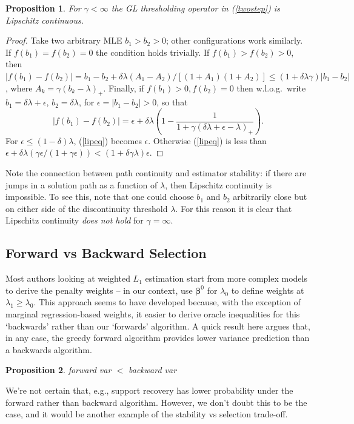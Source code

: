 \documentclass[12pt]{article}
\newtheorem{prop}{\sc Proposition}[section]
\newcommand{\bs}[1]{\boldsymbol{#1}}
\begin{document}
\begin{prop} For $\gamma<\infty$ the GL thresholding  operator in
(\ref{twostep}) is Lipschitz continuous. \end{prop} \begin{proof} Take two
arbitrary MLE $b_1 > b_2 >0$;  other configurations work similarly.   If
$f(b_1) = f(b_2) =0$ the condition holds trivially.   If $f(b_1) > f(b_2) >
0$, then  $|f(b_1) - f(b_2)| = b_1 - b_2 + \delta\lambda (A_1 -
A_2)/[(1+A_1)(1+A_2)] \leq (1+\delta\lambda \gamma)|b_1-b_2|$, where $A_k =
\gamma(b_k-\lambda)_{+}$. Finally, if $f(b_1)>0, f(b_2)=0$ then w.l.o.g.~write $b_1 = \delta\lambda + \epsilon$, $b_2 = \delta\lambda$, for $\epsilon  = |b_1-b_2| > 0$, so
that 
\begin{equation}\label{lipeq}
 |f(b_1) - f(b_2)| =\epsilon  
 + \delta\lambda\left(1 - \frac{1}
 {1 + \gamma(\delta\lambda + \epsilon - \lambda)_+}\right).
 \end{equation} 
For $\epsilon \leq (1-\delta)\lambda$, (\ref{lipeq}) becomes $ \epsilon$.  Otherwise (\ref{lipeq}) is 
less than $\epsilon + \delta\lambda
\left(\gamma\epsilon/(1+\gamma\epsilon)\right) < (1+\delta\gamma\lambda)\epsilon$.
\end{proof}

Note the connection between path continuity and estimator stability: if there
are jumps in a solution path as a function of $\lambda$, then Lipschitz
continuity is impossible. To see this, note that one could choose $b_1$ and
$b_2$ arbitrarily close but on either side of the discontinuity threshold
$\lambda$.  For this reason it is clear that Lipschitz continuity {\it does not
hold} for $\gamma =\infty$.

\subsection{Forward vs Backward Selection}

Most authors looking at weighted $L_1$ estimation start from more complex models to derive the penalty weights -- in our context, use $\bs{\beta}^0$ for $\lambda_0$ to define weights at $\lambda_1 \geq \lambda_0$.  This approach seems to have developed because, with the exception of marginal regression-based weights, it easier to derive oracle inequalities for this `backwards' rather than our `forwards' algorithm.  A quick result here argues that, in any case, the greedy forward algorithm provides lower variance prediction than a backwards algorithm.
\begin{prop}
forward var $<$ backward var
\end{prop}
We're not certain that, e.g., support recovery has lower probability under the forward rather than backward algorithm.  However, we don't doubt this to be the case, and it would be another example of the stability vs selection trade-off.
\end{document}

